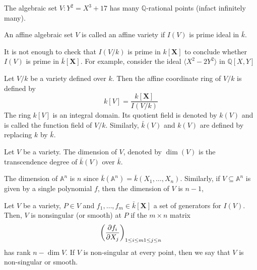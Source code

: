 \documentclass[oneside, 12pt]{scrbook}
\newcommand{\QQ}{\mathbb Q}
\newcommand{\Aa}{\mathbb{A}}
\theoremstyle{theorem}
\begin{document}
\begin{example}
The algebraic set $V: Y^2 = X^{3} + 17$ has many $\QQ$-rational points (infact infinitely many). 
\end{example}

\begin{definition}
An affine algebraic set $V$ is called an affine variety if $I(V)$ is prime ideal in $\bar{k}$. 
\end{definition}
\begin{remark}
It is not enough to check that $I(V/k)$ is prime in $k[\mathbf{X}]$ to conclude whether $I(V)$ is prime in $\bar{k}[\mathbf{X}]$. For example, consider the ideal $\langle X^2 - 2Y^2 \rangle $ in $\QQ[X,Y]$
\end{remark}

\begin{definition}
Let $V/k$ be a variety defined over $k$. Then the affine coordinate ring of $V/k$ is defined by 
\begin{equation}
k[V] = \frac{k[\mathbf{X}]}{I(V/k)}
\end{equation}
The ring $k[V]$ is an integral domain. Its quotient field is denoted by $k(V)$ and is called the function field of $V/k$. Similarly, $\bar{k}(V)$ and $k(V)$ are defined by replacing $k$ by $\bar{k}$.
\end{definition}


\begin{definition}
Let $V$ be a variety. The dimension of $V$, denoted by $\dim (V)$ is the transcendence degree of $\bar{k}(V)$ over $\bar{k}$.
\end{definition}

\begin{example}
The dimension of $\Aa^n$ is $n$ since $\bar{k}(\Aa^n) = \bar{k}(X_{1},\hdots , X_{n})$. Similarly, if $V \subseteq \Aa^n$ is given by a single polynomial $f$, then the dimension of $V$ is $n-1$,
\end{example}

\begin{definition}
Let $V$ be a variety, $P \in V$ and $f_{1}, \hdots , f_{m} \in \bar{k}[\mathbf{X}]$ a set of generators for $I(V)$. Then, $V$ is nonsingular (or smooth) at $P$ if the $m \times n$ matrix $$\left( \frac{\partial f_{i}}{\partial X_{j}} \right)_{1 \le i \le m \\ 1 \le j \le n}$$ has rank $n-\dim V$. If $V$ is non-singular at every point, then we say that $V$ is non-singular or smooth.
\end{definition}
\end{document}
